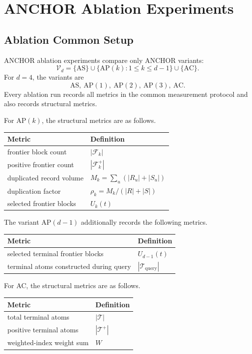\documentclass[11pt]{article}
\newcommand{\ANCHOR}{\textsc{ANCHOR}}
\newcommand{\AC}{\textsc{AC}}
\newcommand{\AP}{\textsc{AP}}
\begin{document}
\section{\ANCHOR{} Ablation Experiments}

\subsection{Ablation Common Setup}
\ANCHOR{} ablation experiments compare only \ANCHOR{} variants:
\[
\mathcal{V}_d
=
\{\mathrm{AS}\}
\cup
\{\mathrm{AP}(k):1\le k\le d-1\}
\cup
\{\mathrm{AC}\}.
\]
For $d=4$, the variants are
\[
\boxed{\mathrm{AS},\ \mathrm{AP}(1),\ \mathrm{AP}(2),\ \mathrm{AP}(3),\ \mathrm{AC}}.
\]
Every ablation run records all metrics in the common measurement protocol and also records structural metrics.

For \AP$(k)$, the structural metrics are as follows.

\begin{center}
\begin{tabularx}{\linewidth}{@{}lY@{}}
\toprule
Metric & Definition \\
\midrule
frontier block count & $|\mathcal{F}_k|$ \\
positive frontier count & $|\mathcal{F}_k^+|$ \\
duplicated record volume & $M_k=\sum_u(|R_u|+|S_u|)$ \\
duplication factor & $\rho_k=M_k/(|R|+|S|)$ \\
selected frontier blocks & $U_k(t)$ \\
\bottomrule
\end{tabularx}
\end{center}

The variant \AP$(d-1)$ additionally records the following metrics.

\begin{center}
\begin{tabularx}{\linewidth}{@{}lY@{}}
\toprule
Metric & Definition \\
\midrule
selected terminal frontier blocks & $U_{d-1}(t)$ \\
terminal atoms constructed during query & $|\mathcal{T}_{\mathrm{query}}|$ \\
\bottomrule
\end{tabularx}
\end{center}

For \AC, the structural metrics are as follows.

\begin{center}
\begin{tabularx}{\linewidth}{@{}lY@{}}
\toprule
Metric & Definition \\
\midrule
total terminal atoms & $|\mathcal{T}|$ \\
positive terminal atoms & $|\mathcal{T}^+|$ \\
weighted-index weight sum & $W$ \\
\bottomrule
\end{tabularx}
\end{center}
\end{document}
